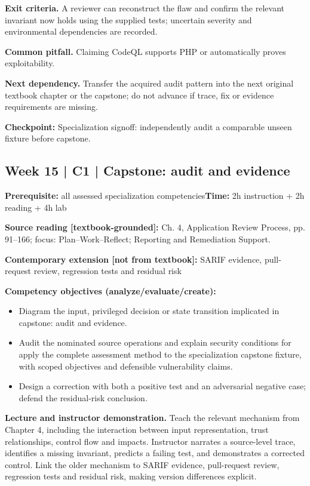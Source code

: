 \documentclass[10pt,letterpaper]{article}
\begin{document}
\textbf{Exit criteria.} A reviewer can reconstruct the flaw and confirm the relevant invariant now holds using the supplied tests; uncertain severity and environmental dependencies are recorded.

\textbf{Common pitfall.} Claiming CodeQL supports PHP or automatically proves exploitability.

\textbf{Next dependency.} Transfer the acquired audit pattern into the next original textbook chapter or the capstone; do not advance if trace, fix or evidence requirements are missing.

\begin{historynote}\textbf{Checkpoint:} Specialization signoff: independently audit a comparable unseen fixture before capstone.\end{historynote}
\subsection{Week 15 | C1 | Capstone: audit and evidence}
\textbf{Prerequisite:} all assessed specialization competencies\hfill\textbf{Time:} 2h instruction + 2h reading + 4h lab

\textbf{Source reading [textbook-grounded]:} Ch. 4, Application Review Process, pp. 91--166; focus: Plan--Work--Reflect; Reporting and Remediation Support.

\textbf{Contemporary extension [not from textbook]:} SARIF evidence, pull-request review, regression tests and residual risk

\textbf{Competency objectives (analyze/evaluate/create):}
\begin{itemize}[leftmargin=*,itemsep=2pt]
\item Diagram the input, privileged decision or state transition implicated in capstone: audit and evidence.
\item Audit the nominated source operations and explain security conditions for apply the complete assessment method to the specialization capstone fixture, with scoped objectives and defensible vulnerability claims.
\item Design a correction with both a positive test and an adversarial negative case; defend the residual-risk conclusion.
\end{itemize}
\textbf{Lecture and instructor demonstration.} Teach the relevant mechanism from Chapter 4, including the interaction between input representation, trust relationships, control flow and impacts. Instructor narrates a source-level trace, identifies a missing invariant, predicts a failing test, and demonstrates a corrected control. Link the older mechanism to SARIF evidence, pull-request review, regression tests and residual risk, making version differences explicit.
\end{document}
